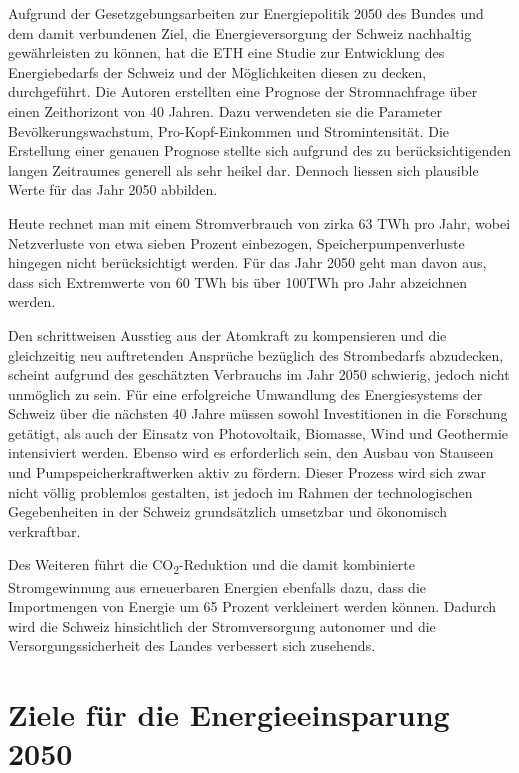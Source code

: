 Aufgrund der Gesetzgebungsarbeiten zur Energiepolitik 2050 des Bundes und dem damit verbundenen Ziel, die Energieversorgung der Schweiz nachhaltig gewährleisten zu können, hat die ETH eine Studie zur Entwicklung des Energiebedarfs der Schweiz und der Möglichkeiten diesen zu decken, durchgeführt. Die Autoren erstellten eine Prognose der Stromnachfrage über einen Zeithorizont von 40 Jahren. Dazu verwendeten sie die Parameter Bevölkerungswachstum, Pro-Kopf-Einkommen und Stromintensität. Die Erstellung einer genauen Prognose stellte sich aufgrund des zu berücksichtigenden langen Zeitraumes generell als sehr heikel dar. Dennoch liessen sich plausible Werte für das Jahr 2050 abbilden.
\par
Heute rechnet man mit einem Stromverbrauch von zirka 63 TWh pro Jahr, wobei Netzverluste von etwa sieben Prozent einbezogen, Speicherpumpenverluste hingegen nicht berücksichtigt werden. Für das Jahr 2050 geht man davon aus, dass sich Extremwerte von 60 TWh bis über 100TWh pro Jahr abzeichnen werden.
\par
Den schrittweisen Ausstieg aus der Atomkraft zu kompensieren und die gleichzeitig neu auftretenden Ansprüche bezüglich des Strombedarfs abzudecken, scheint aufgrund des geschätzten Verbrauchs im Jahr 2050 schwierig, jedoch nicht unmöglich zu sein. Für eine erfolgreiche Umwandlung des Energiesystems der Schweiz über die nächsten 40 Jahre müssen sowohl Investitionen in die Forschung getätigt, als auch der Einsatz von Photovoltaik, Biomasse, Wind und Geothermie intensiviert werden.
Ebenso wird es erforderlich sein, den Ausbau von Stauseen und Pumpspeicherkraftwerken aktiv zu fördern. Dieser Prozess wird sich zwar nicht völlig problemlos gestalten, ist jedoch im Rahmen der technologischen Gegebenheiten in der Schweiz grundsätzlich umsetzbar und ökonomisch verkraftbar.
\par
Des Weiteren führt die CO\textsubscript{2}-Reduktion und die damit kombinierte Stromgewinnung aus erneuerbaren Energien ebenfalls dazu, dass die Importmengen von Energie um 65 Prozent verkleinert werden können. Dadurch wird die Schweiz hinsichtlich der Stromversorgung autonomer und die Versorgungssicherheit des Landes verbessert sich zusehends.
 

\section{Ziele für die Energieeinsparung 2050\cite{uvek_energie_schweiz}}

